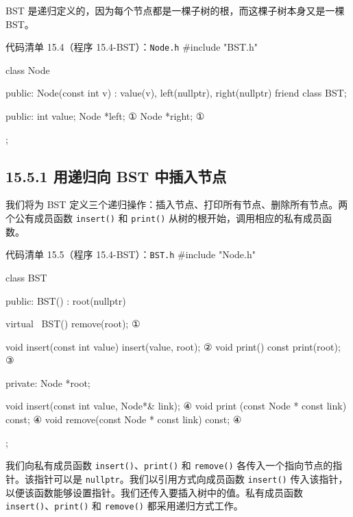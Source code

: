 BST 是递归定义的，因为每个节点都是一棵子树的根，而这棵子树本身又是一棵 BST。

\begin{codeboxt}{代码清单 15.4（程序 15.4-BST）：\texttt{Node.h}}
#include "BST.h"

class Node
{
public:
    Node(const int v) : value(v), left(nullptr), right(nullptr) {}
    friend class BST;

public:
    int value;
    Node *left;                                         ①
    Node *right;                                        ①
};
\end{codeboxt}
\par

\subsection{15.5.1 用递归向 BST 中插入节点}

我们将为 BST 定义三个递归操作：插入节点、打印所有节点、删除所有节点。两个公有成员函数 \texttt{insert()} 和 \texttt{print()} 从树的根开始，调用相应的私有成员函数。

\begin{codeboxt}{代码清单 15.5（程序 15.4-BST）：\texttt{BST.h}}
#include "Node.h"

class BST
{
public:
    BST() : root(nullptr) {}

    virtual ~BST() { remove(root); }                      ①

    void insert(const int value) { insert(value, root); } ②
    void print() const           { print(root); }         ③

private:
    Node *root;

    void insert(const int value, Node*& link);            ④
    void print (const Node * const link) const;           ④
    void remove(const Node * const link) const;           ④
};
\end{codeboxt}
\par
{}\par
{}\par
{}\par

我们向私有成员函数 \texttt{insert()}、\texttt{print()} 和 \texttt{remove()} 各传入一个指向节点的指针。该指针可以是 \texttt{nullptr}。我们以引用方式向成员函数 \texttt{insert()} 传入该指针，以便该函数能够设置指针。我们还传入要插入树中的值。私有成员函数 \texttt{insert()}、\texttt{print()} 和 \texttt{remove()} 都采用递归方式工作。


